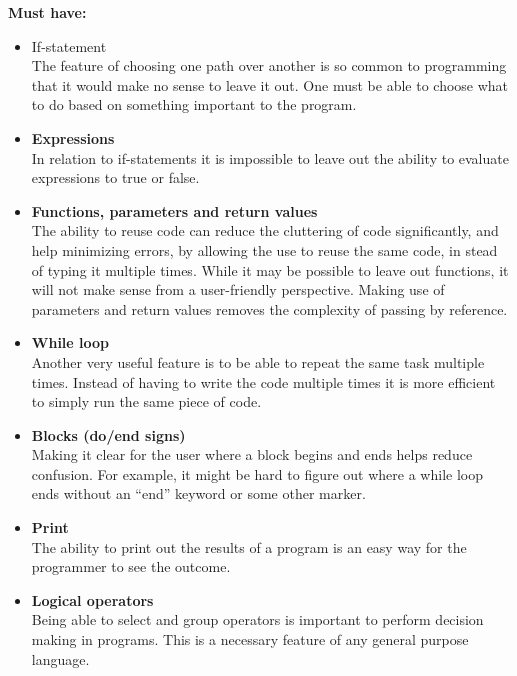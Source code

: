 \textbf{Must have:}
\begin{itemize}
\item If-statement \\
The feature of choosing one path over another is so common to programming that it would make no sense to leave it out. One must be able to choose what to do based on something important to the program. \\

\item \textbf{Expressions} \\
In relation to if-statements it is impossible to leave out the ability to evaluate expressions to true or false. \\

\item \textbf{Functions, parameters and return values} \\
The ability to reuse code can reduce the cluttering of code significantly, and help minimizing errors, by allowing the use to reuse the same code, in stead of typing it
multiple times. While it may be possible to leave out functions, it will not make sense from a user-friendly perspective. Making use of parameters and return values removes the complexity of passing by reference. \\

\item \textbf{While loop} \\
Another very useful feature is to be able to repeat the same task multiple times. Instead of having to write the code multiple times it is more efficient to simply run the same piece of code. \\

\item \textbf{Blocks (do/end signs)} \\
Making it clear for the user where a block begins and ends helps reduce confusion. For example, it might be hard to figure out where a while loop ends without an ``end'' keyword or some other marker. \\

\item \textbf{Print} \\
The ability to print out the results of a program is an easy way for the programmer to see the outcome. \\

\item \textbf{Logical operators} \\
Being able to select and group operators is important to perform decision making in programs. This is a necessary feature of any general purpose language.\\


\end{itemize}
